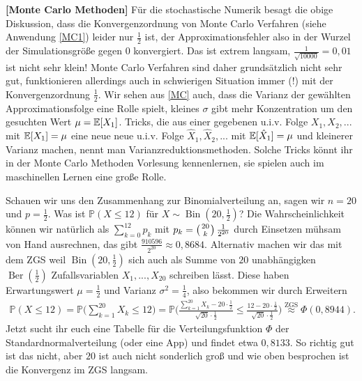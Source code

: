 \begin{anwendung}
 \textbf{[Monte Carlo Methoden]}
F\"ur die stochastische Numerik besagt die obige Diskussion, dass die Konvergenzordnung von Monte Carlo Verfahren (siehe Anwendung \ref{MC1}) leider nur $\frac{1}{2}$ ist, der Approximationsfehler also in der Wurzel der Simulationsgr\"o\ss e gegen $0$ konvergiert. Das ist extrem langsam, $\frac{1}{\sqrt{10000}}=0,01$ ist nicht sehr klein! Monte Carlo Verfahren sind daher grunds\"atzlich nicht sehr gut, funktionieren allerdings auch in schwierigen Situation immer (!) mit der Konvergenzordnung $\frac 1 2$. Wir sehen aus \eqref{MC} auch, dass die Varianz der gew\"ahlten Approximationsfolge eine Rolle spielt, kleines $\sigma$ gibt mehr Konzentration um den gesuchten Wert $\mu=\mathbb{E}[X_1]$. Tricks, die aus einer gegebenen u.i.v. Folge $X_1,X_2,...$ mit $\mathbb{E}[X_1]=\mu$ eine neue neue u.i.v. Folge $\hat X_1,\hat X_2,...$ mit $\mathbb{E}[\hat X_1]=\mu$ und kleinerer Varianz machen, nennt man Varianzreduktionsmethoden. Solche Tricks k\"onnt ihr in der Monte Carlo Methoden Vorlesung kennenlernen, sie spielen auch im maschinellen Lernen eine gro\ss e Rolle.
\end{anwendung}

\begin{beispiel}
	Schauen wir uns den Zusammenhang zur Binomialverteilung an, sagen wir $n=20$ und $p=\frac{1}{2}$. Was ist $\mathbb P(X\leq 12)$ f\"ur $X\sim \operatorname{Bin}(20,\frac 1 2)$? Die Wahrscheinlichkeit k\"onnen wir nat\"urlich als $\sum_{k=0}^{12} p_k$ mit $p_k=\left(20\atop k\right) \frac{1}{2^{20}}$ durch Einsetzen m\"uhsam von Hand ausrechnen, das gibt $\frac{910596}{2^{20}}\approx 0,8684$. Alternativ machen wir das mit dem ZGS weil $\operatorname{Bin}(20,\frac 1 2)$ sich auch als Summe von $20$ unabh\"angigken $\operatorname{Ber}(\frac 1 2)$ Zufallsvariablen $X_1,...,X_{20}$ schreiben l\"asst. Diese haben Erwartungswert $\mu=\frac 1 2$ und Varianz $\sigma^2=\frac 1 4$, also bekommen wir durch Erweitern
	\begin{align*}
		\mathbb P(X\leq 12)=\mathbb P\Big(\sum_{k=1}^{20} X_k\leq 12\Big)
		=\mathbb P\Big(\frac{ \sum_{k=1}^{20} X_k-20\cdot \frac{1}{2}}{\sqrt{20} \cdot \frac{1}{2}}\leq \frac{12-20\cdot \frac{1}{2}}{\sqrt{20}\cdot \frac{1}{2}}\Big)
		\overset{\text{ZGS}}{\approx } \Phi(0,8944).
	\end{align*}
	Jetzt sucht ihr euch eine Tabelle f\"ur die Verteilungsfunktion $\Phi$ der Standardnormalverteilung (oder eine App) und findet etwa $0,8133$. So richtig gut ist das nicht, aber $20$ ist auch nicht sonderlich gro\ss{} und wie oben besprochen ist die Konvergenz im ZGS langsam. 	
	
\end{beispiel}


